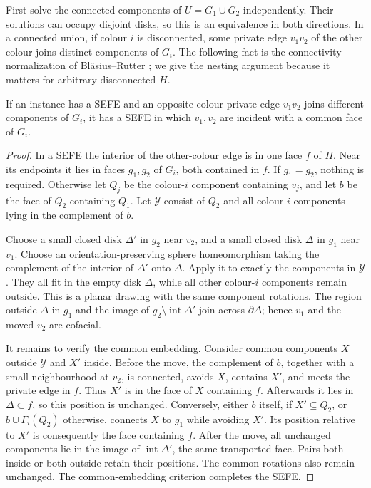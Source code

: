 First solve the connected components of $U=G_1\cup G_2$ independently.
Their solutions can occupy disjoint disks, so this is an equivalence in
both directions. In a connected union, if colour $i$ is disconnected,
some private edge $v_1v_2$ of the other colour joins distinct components
of $G_i$. The following fact is the connectivity normalization of
Bl\"asius--Rutter \cite[Section~2, Lemma~1 and Theorem~1]{brdisconnect}; we
give the nesting argument because it matters for arbitrary disconnected $H$.

\begin{lemma}
\label{norm:cofacial}
If an instance has a SEFE and an opposite-colour private edge $v_1v_2$
joins different components of $G_i$, it has a SEFE in which $v_1,v_2$
are incident with a common face of $G_i$.
\end{lemma}
\begin{proof}
In a SEFE the interior of the other-colour edge is in one face $f$ of
$H$. Near its endpoints it lies in faces $g_1,g_2$ of $G_i$, both
contained in $f$. If $g_1=g_2$, nothing is required. Otherwise let $Q_j$
be the colour-$i$ component containing $v_j$, and let $b$ be the face of
$Q_2$ containing $Q_1$. Let $\mathcal Y$ consist of $Q_2$ and all
colour-$i$ components lying in the complement of $b$.

Choose a small closed disk $\Delta'$ in $g_2$ near $v_2$, and a small
closed disk $\Delta$ in $g_1$ near $v_1$. Choose an orientation-preserving
sphere homeomorphism taking the complement of the interior of $\Delta'$
onto $\Delta$. Apply it to exactly the components in $\mathcal Y$.
They all fit in the empty disk $\Delta$, while all other colour-$i$
components remain outside. This is a planar drawing with the same
component rotations. The region outside $\Delta$ in $g_1$ and the image
of $g_2\setminus\operatorname{int}\Delta'$ join across $\partial\Delta$;
hence $v_1$ and the moved $v_2$ are cofacial.

It remains to verify the common embedding. Consider common components
$X$ outside $\mathcal Y$ and $X'$ inside. Before the move,
the complement of $b$, together with a small neighbourhood at $v_2$,
is connected, avoids $X$, contains $X'$, and meets the private edge
in $f$. Thus $X'$ is in the face of $X$ containing $f$. Afterwards it
lies in $\Delta\subset f$, so this position is unchanged.
Conversely, either $b$ itself, if $X'\subseteq Q_2$, or
$b\cup\Gamma_i(Q_2)$ otherwise, connects $X$ to $g_1$ while avoiding
$X'$. Its position relative to $X'$ is consequently the face containing
$f$. After the move, all unchanged components lie in the image of
$\operatorname{int}\Delta'$, the same transported face. Pairs both inside
or both outside retain their positions. The common rotations also
remain unchanged. The common-embedding criterion completes the SEFE.
\end{proof}

